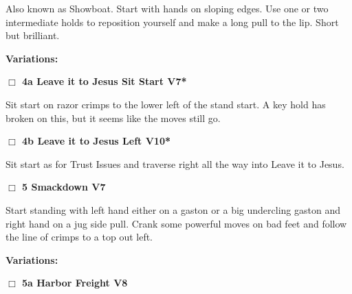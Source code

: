 \begin{multicols}{2}
\begin{adjustwidth}{1.3em}{}
Also known as Showboat. Start with hands on sloping edges. Use one or two intermediate holds to reposition yourself and make a long pull to the lip. Short but brilliant.
\end{adjustwidth}


\begin{adjustwidth}{0.5cm}{}				
\needspace{4em}
\textbf{Variations:} \newline

\needspace{2em}
\label{vr:Leave it to Jesus Sit Start}
\colorbox{Goldenrod!20}{
\parbox{0.95\linewidth}{
\hspace{-1ex}\textbf{$\Box$
4a Leave it to Jesus Sit Start V7*  
}}}
\begin{adjustwidth}{1.3em}{}			

Sit start on razor crimps to the lower left of the stand start. A key hold has broken on this, but it seems like the moves still go.
\end{adjustwidth}




\needspace{2em}
\label{vr:Leave it to Jesus Left}
\colorbox{red!20}{
\parbox{0.95\linewidth}{
\hspace{-1ex}\textbf{$\Box$
4b Leave it to Jesus Left V10*  
}}}
\begin{adjustwidth}{1.3em}{}			

Sit start as for Trust Issues and traverse right all the way into Leave it to Jesus.
\end{adjustwidth}



\end{adjustwidth}


\needspace{2em}
\label{rt:Smackdown}
\colorbox{Goldenrod!20}{
\parbox{0.95\linewidth}{
\hspace{-1ex}\textbf{$\Box$
5 Smackdown V7  
}}}
\begin{adjustwidth}{1.3em}{}			

Start standing with left hand either on a gaston or a big undercling gaston and right hand on a jug side pull. Crank some powerful moves on bad feet and follow the line of crimps to a top out left.
\end{adjustwidth}


\begin{adjustwidth}{0.5cm}{}				
\needspace{4em}
\textbf{Variations:} \newline

\needspace{2em}
\label{vr:Harbor Freight}
\colorbox{Goldenrod!20}{
\parbox{0.95\linewidth}{
\hspace{-1ex}\textbf{$\Box$
5a Harbor Freight V8  
}}}
\begin{adjustwidth}{1.3em}{}			


\end{adjustwidth}
\end{adjustwidth}
\end{multicols}
